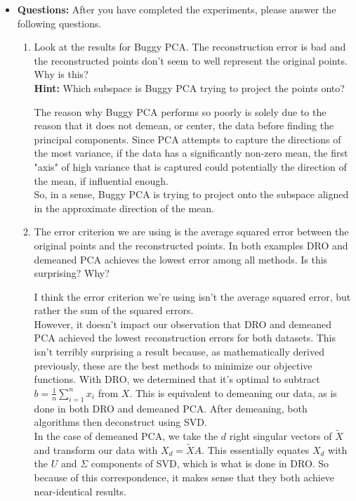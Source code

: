 \documentclass[a4paper]{article}
\newcounter{thm}
\theoremstyle{definition}
\newenvironment{soln}{
	\leavevmode\color{blue}\ignorespaces
}{}
\begin{document}
\begin{itemize}
\item \textbf{Questions:} After you have completed the experiments, please answer the following questions.
\begin{enumerate}
\item Look at the results for Buggy PCA. The reconstruction error is bad and the
reconstructed points don't seem to well represent the original points. Why is
this? \\
\textbf{Hint: } Which subspace is Buggy PCA trying to project the points
onto?

\begin{soln}
	The reason why Buggy PCA performs so poorly is solely due to the reason that it does not demean, or center, the data before finding the principal components. Since PCA attempts to capture the directions of the most variance, if the data has a significantly non-zero mean, the first "axis" of high variance that is captured could potentially the direction of the mean, if influential enough. \\
	So, in a sense, Buggy PCA is trying to project onto the subspace aligned in the approximate direction of the mean.
\end{soln}

\item The error criterion we are using is the average squared error 
between the original points and the reconstructed points.
In both examples DRO and demeaned PCA achieves the lowest error among all
methods. 
Is this surprising? Why?

\begin{soln}
	I think the error criterion we're using isn't the average squared error, but rather the sum of the squared errors. \\
	However, it doesn't impact our observation that DRO and demeaned PCA achieved the lowest reconstruction errors for both datasets. This isn't terribly surprising a result because, as mathematically derived previously, these are the best methods to minimize our objective functions. With DRO, we determined that it's optimal to subtract $b = \frac{1}{n} \sum_{i=1}^{n} x_i$ from $X$. This is equivalent to demeaning our data, as is done in both DRO and demeaned PCA. After demeaning, both algorithms then deconstruct using SVD. \\
	In the case of demeaned PCA, we take the $d$ right singular vectors of $\tilde{X}$ and transform our data with $X_d = \tilde{X} A$. This essentially equates $X_d$ with the $U$ and $\Sigma$ components of SVD, which is what is done in DRO. So because of this correspondence, it makes sense that they both achieve near-identical results.
\end{soln}


\end{enumerate}
\end{itemize}
\end{document}
